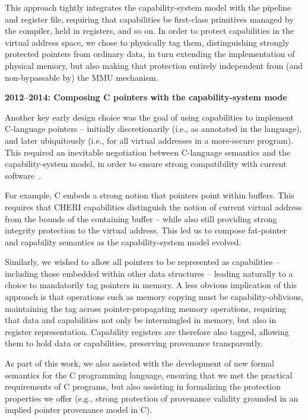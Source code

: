 This approach tightly integrates the capability-system model with the pipeline
and register file, requiring that capabilities be first-class primitives
managed by the compiler, held in registers, and so on.
In order to protect capabilities in the virtual address space, we chose to
physically tag them, distinguishing strongly protected pointers from ordinary
data, in turn extending the implementation of physical memory, but also making
that protection entirely independent from (and non-bypassable by) the MMU
mechanism.

\medskip
\noindent
\textbf{2012--2014: Composing C pointers with the capability-system mode}

\smallskip
\noindent
Another key early design choice was the goal of using capabilities to
implement C-language pointers -- initially discretionarily (i.e., as annotated
in the language), and later ubiquitously (i.e., for all virtual addresses in a 
more-secure program).
This required an inevitable negotiation between C-language semantics and the
capability-system model, in order to ensure strong compatibility with current
software~\cite{ChisnallCPDP11,Cerberus-PLDI16}.

For example, C embeds a strong notion that pointers point within buffers.
This requires that CHERI capabilities distinguish the notion of current virtual
address from the bounds of the containing buffer -- while also still providing
strong integrity protection to the virtual address.
This led us to compose
fat-pointer~\cite{trevor:cyclone,Nagarakatte:2009:SHC:1542476.1542504,Necula:2002:CTR:503272.503286} and capability
semantics as the capability-system model evolved.

Similarly, we wished to allow all pointers to be represented as capabilities
-- including those embedded within other data structures -- leading naturally
to a choice to mandatorily tag pointers in memory.
A less obvious implication of this approach is that operations such as memory
copying must be capability-oblivious, maintaining the tag across
pointer-propagating memory operations, requiring that data and capabilities
not only be intermingled in memory, but also in register representation.
Capability registers are therefore also tagged, allowing them to hold data or
capabilities, preserving provenance transparently.

As part of this work, we also assisted with the development of new formal
semantics for the C programming language, ensuring that we met the practical
requirements of C programs, but also assisting in formalizing the protection
properties we offer (e.g., strong protection of provenance validity grounded
in an implied pointer provenance model in C).

